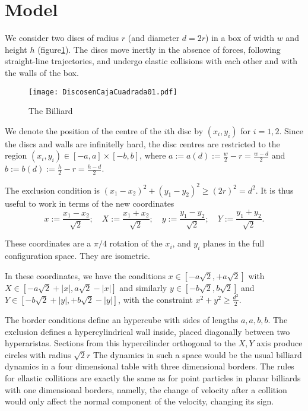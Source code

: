 \documentclass[letterpaper,12pt]{amsart}
\newcommand{\defeq}{:=}
\begin{document}
\section{Model}

We consider two discs of radius $r$ (and diameter $d=2r$) 
in a box of width $w$ and height $h$ (figure\ref{billar01}). 
The discs move inertly in the absence of forces, 
following straight-line trajectories, 
and undergo elastic collisions with each other and with the walls of the box.

\begin{figure}
  \centering
  \texttt{[image: DiscosenCajaCuadrada01.pdf]}
  \caption{The Billiard}\label{billar01}
\end{figure}


We denote the position of the centre of the $i$th disc by 
$(x_{i}, y_{i})$ for $i=1,2$. 
Since the discs and walls are infinitelly hard, 
the disc centres are restricted to the region $(x_i, y_i) \in [-a,a] \times [-b, b]$, 
where $a \defeq a(d) \defeq \frac{w}{2} - r = \frac{w-d}{2}$ and 
$b \defeq b(d) \defeq \frac{h}{2} - r = \frac{h-d}{2}$.

The exclusion condition is $(x_1-x_2)^2 + (y_1-y_2)^2 \ge (2r)^2 = d^2$.
It is thus useful to work in terms of the new coordinates
\begin{equation}\label{cambiocoor01}
 x \defeq \frac{x_1 - x_2}{\sqrt{2}}; 
\quad X \defeq \frac{x_1 + x_2}{\sqrt{2}}; 
\quad y \defeq \frac{y_1 - y_2}{\sqrt{2}}; 
\quad Y \defeq \frac{y_1 + y_2}{\sqrt{2}}.
\end{equation}

These coordinates are a $\pi/4$ rotation of the $x_i$, and  $y_i$ planes in the
full configuration space. They are isometric.

In these coordinates, we have the conditions 
$x \in [-a \sqrt{2}, +a \sqrt{2}]$ with $X \in [-a \sqrt{2} + |x|, a \sqrt{2} - |x|]$ 
and similarly $y \in [-b \sqrt{2}, b \sqrt{2}]$ and 
$Y \in [-b \sqrt{2} + |y|, +b \sqrt{2} - |y|]$,  
with the constraint $x^2 + y^2 \ge \frac{d^2}{2}$.

The border conditions define an hypercube with  sides of lengths $a,a,b,b$.
The exclusion defines a  hypercylindrical wall inside, placed
diagonally between two hyperaristas. Sections from this hypercilinder
orthogonal to the $X,Y$ axis produce circles with radius $\sqrt{2} r$
The dynamics in such a space
would be the usual billiard dynamics in a four dimensional table with
three dimensional borders. The rules for ellastic collitions
are exactly the same as for point particles 
in planar billiards with one dimensional
borders, namelly, the change of velocity after a collition would only
affect the normal component of the velocity, changing its sign. 
\end{document}
